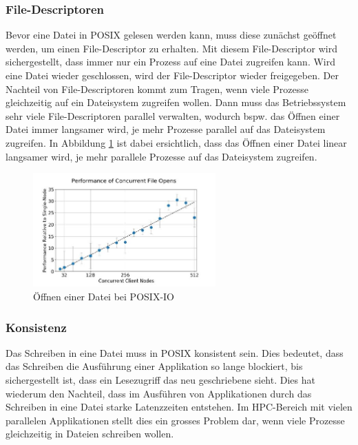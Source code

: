 \subsubsection{File-Descriptoren}
Bevor eine Datei in POSIX gelesen werden kann, muss diese zun\"achst ge\"offnet werden, um einen File-Descriptor zu erhalten. Mit diesem File-Descriptor wird sichergestellt, dass immer nur ein Prozess auf eine Datei zugreifen kann. Wird eine Datei wieder geschlossen, wird der File-Descriptor wieder freigegeben.\newline
Der Nachteil von File-Descriptoren kommt zum Tragen, wenn viele Prozesse gleichzeitig auf ein Dateisystem zugreifen wollen. Dann muss das Betriebssystem sehr viele File-Descriptoren parallel verwalten, wodurch bspw. das \"Offnen einer Datei immer langsamer wird, je mehr Prozesse parallel auf das Dateisystem zugreifen. In Abbildung \ref{fig:posix} ist dabei ersichtlich, dass das \"Offnen einer Datei linear langsamer wird, je mehr parallele Prozesse auf das Dateisystem zugreifen.
\begin{figure}[h]
	\centering
	\includegraphics[width=7cm]{fig/PosixIO.jpg}
	\caption{\"Offnen einer Datei bei POSIX-IO \cite{Lockwood.11.09.2017}}
	\label{fig:posix}
\end{figure}
\subsubsection{Konsistenz}
Das Schreiben in eine Datei muss in POSIX konsistent sein. Dies bedeutet, dass das Schreiben die Ausf\"uhrung einer Applikation so lange blockiert, bis sichergestellt ist, dass ein Lesezugriff das neu geschriebene sieht. Dies hat wiederum den Nachteil, dass im Ausführen von Applikationen durch das Schreiben in eine Datei starke Latenzzeiten entstehen. Im HPC-Bereich mit vielen parallelen Applikationen stellt dies ein grosses Problem dar, wenn viele Prozesse gleichzeitig in Dateien schreiben wollen.
\cite{Lockwood.11.09.2017}
